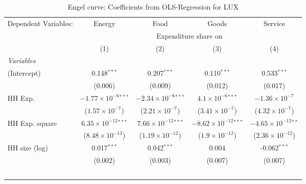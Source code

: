
\begin{table}[htbp!]
   \centering
   \small
   \begin{adjustbox}{width = 1\textwidth, max height = 0.95\textheight, center}
      \begin{threeparttable}[b]
         \caption{\label{tab:Engel_parametric_LUX} Engel curve: Coefficients from OLS-Regression for LUX}
         \begin{tabular}{lcccc}
            \tabularnewline \midrule \midrule
            Dependent Variables: & Energy                         & Food                           & Goods                           & Service\\  
             & \multicolumn{4}{c}{Expenditure share on} \\ 
                                 & (1)                            & (2)                            & (3)                             & (4)\\  
            \midrule
            \emph{Variables}\\
            (Intercept)          & 0.148$^{***}$                  & 0.207$^{***}$                  & 0.110$^{***}$                   & 0.533$^{***}$\\   
                                 & (0.006)                        & (0.009)                        & (0.012)                         & (0.017)\\   
            HH Exp.              & $-1.77\times 10^{-6}$$^{***}$  & $-2.34\times 10^{-6}$$^{***}$  & $4.1\times 10^{-6}$$^{***}$     & $-1.36\times 10^{-7}$\\    
                                 & ($1.57\times 10^{-7}$)         & ($2.21\times 10^{-7}$)         & ($3.41\times 10^{-7}$)          & ($4.32\times 10^{-7}$)\\    
            HH Exp. square       & $6.35\times 10^{-12}$$^{***}$  & $7.66\times 10^{-12}$$^{***}$  & $-8.62\times 10^{-12}$$^{***}$  & $-4.65\times 10^{-12}$$^{**}$\\    
                                 & ($8.48\times 10^{-13}$)        & ($1.19\times 10^{-12}$)        & ($1.9\times 10^{-12}$)          & ($2.36\times 10^{-12}$)\\    
            HH size (log)        & 0.017$^{***}$                  & 0.042$^{***}$                  & 0.004                           & -0.062$^{***}$\\   
                                 & (0.002)                        & (0.003)                        & (0.007)                         & (0.007)\\   
$$
\end{tabular}
\end{threeparttable}
\end{adjustbox}
\end{table}
